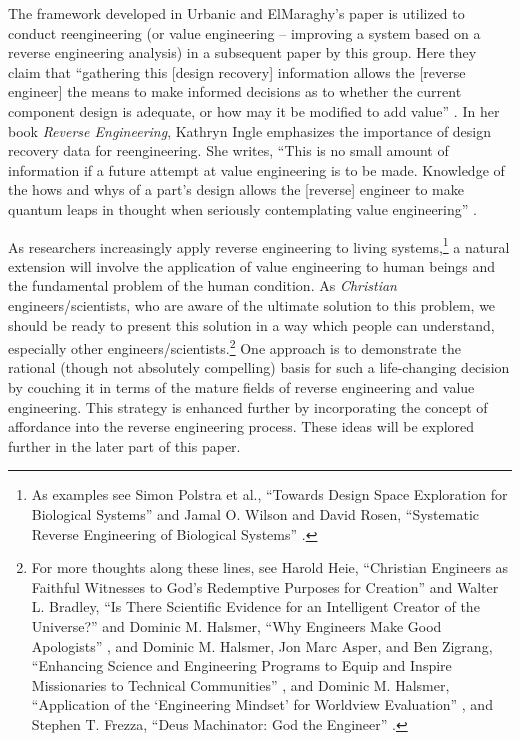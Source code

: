 The framework developed in Urbanic and ElMaraghy's paper is utilized to conduct
reengineering (or value engineering – improving a system based on a
reverse engineering analysis) in a subsequent paper by this group. Here
they claim that ``gathering this [design recovery] information allows
the [reverse engineer] the means to make informed decisions as to
whether the current component design is adequate, or how may it be
modified to add value'' \citep[][p.~166]{urbanicelmaraghy2009b}. In her 
book \textit{Reverse Engineering}, Kathryn Ingle emphasizes the importance of design
recovery data for reengineering. She writes, “This is no small amount
of information if a future attempt at value engineering is to be made.
Knowledge of the hows and whys of a part’s design allows the [reverse]
engineer to make quantum leaps in thought when seriously contemplating
value engineering” \citep[][pp. 65--66]{ingle1994}. 

As researchers increasingly
apply reverse engineering to living systems,\footnote{
As examples see Simon Polstra et al., “Towards
Design Space Exploration for Biological Systems” 
and Jamal O. Wilson and David Rosen,
“Systematic Reverse Engineering of Biological Systems” \citep{wilsonrosen2007}.
} a
natural extension will involve the application of value engineering to
human beings and the fundamental problem of the human condition. As
\textit{Christian} engineers/scientists, who are aware of the ultimate
solution to this problem, we should be ready to present this solution
in a way which people can understand, especially other
engineers/scientists.\footnote{
For more thoughts along these lines, see Harold
Heie, “Christian Engineers as Faithful Witnesses to God’s Redemptive
Purposes for Creation” \citep{heie1999}
and Walter L. Bradley,
“Is There Scientific Evidence for an Intelligent Creator of the
Universe?” \citep{bradley2003}
and Dominic M. Halsmer, “Why Engineers Make Good Apologists” \citep{halsmer2007},
 and Dominic M. Halsmer, Jon Marc Asper, and Ben Zigrang,
“Enhancing Science and Engineering Programs to Equip and Inspire
Missionaries to Technical Communities” ,
and Dominic M. Halsmer,
“Application of the ‘Engineering Mindset’ for Worldview Evaluation” \citep{halsmer2009},
and Stephen T. Frezza, “Deus Machinator: God the Engineer” \citep{frezza2009}.
} One approach is to
demonstrate the rational (though not absolutely compelling) basis for
such a life-changing decision by couching it in terms of the mature
fields of reverse engineering and value engineering. This strategy is
enhanced further by incorporating the concept of affordance into the
reverse engineering process. These ideas will be explored further in
the later part of this paper.

